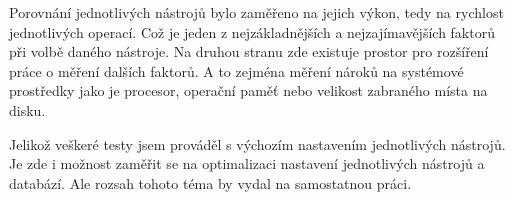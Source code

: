 Porovnání jednotlivých nástrojů bylo zaměřeno na jejich výkon, tedy na rychlost jednotlivých operací. Což je jeden z nejzákladnějších a nejzajímavějších faktorů při volbě daného nástroje. Na druhou stranu zde existuje prostor pro rozšíření práce o měření dalších faktorů. A to zejména měření nároků na systémové prostředky jako je procesor, operační paměť nebo velikost zabraného místa na disku.

Jelikož veškeré testy jsem prováděl s výchozím nastavením jednotlivých nástrojů. Je zde i možnost zaměřit se na optimalizaci nastavení jednotlivých nástrojů a databází. Ale rozsah tohoto téma by vydal na samostatnou práci. 





